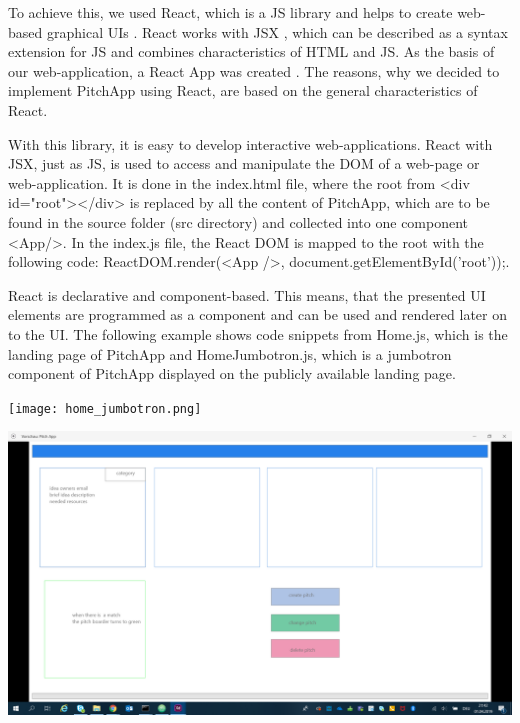 To achieve this, we used React, which is a JS library and helps to create web-based graphical UIs \parencite{React}. React works with JSX \parencite{JSX}, which can be described as a syntax extension for JS and combines characteristics of HTML and JS. As the basis of our web-application, a React App was created \parencite{Reactstrap}. The reasons, why we decided to implement PitchApp using React, are based on the general characteristics of React.

With this library, it is easy to develop interactive web-applications. React with JSX, just as JS, is used to access and manipulate the DOM of a web-page or web-application. It is done in the index.html file, where the root from <div id="root"></div> is replaced by all the content of PitchApp, which are to be found in the source folder (src directory) and collected into one component <App/>. In the index.js file, the React DOM is mapped to the root with the following code: ReactDOM.render(<App />, document.getElementById('root'));.

React is declarative and component-based. This means, that the presented UI elements are programmed as a component and can be used and rendered later on to the UI. The following example shows code snippets from Home.js, which is the landing page of PitchApp and HomeJumbotron.js, which is a jumbotron component of PitchApp displayed on the publicly available landing page.

\begin{center}
	\texttt{[image: home\_jumbotron.png]}
\end{center} 

\begin{center}
	\includegraphics{home.png}
\end{center} 

